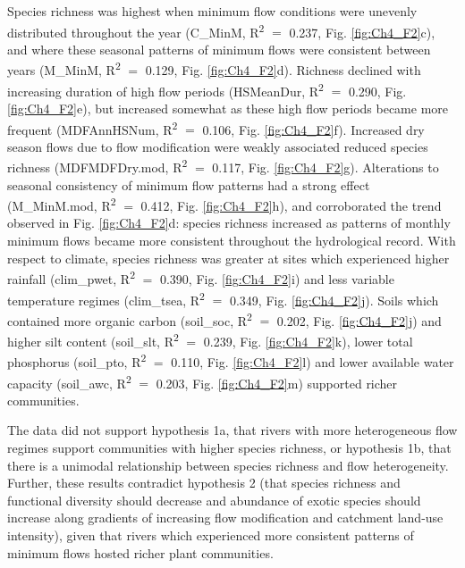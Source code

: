 \documentclass[openright,12pt,a4paper]{memoir}
\begin{document}
Species richness was highest when minimum flow conditions were unevenly distributed throughout the year (C\_MinM, R\textsuperscript{2}  $=$ 0.237, Fig. \ref{fig:Ch4_F2}c), and where these seasonal patterns of minimum flows were consistent between years (M\_MinM, R\textsuperscript{2}  $=$ 0.129, Fig. \ref{fig:Ch4_F2}d). Richness declined with increasing duration of high flow periods (HSMeanDur, R\textsuperscript{2}  $=$ 0.290, Fig. \ref{fig:Ch4_F2}e), but increased somewhat as these high flow periods became more frequent (MDFAnnHSNum, R\textsuperscript{2}  $=$ 0.106, Fig. \ref{fig:Ch4_F2}f). Increased dry season flows due to flow modification were weakly associated reduced species richness (MDFMDFDry.mod, R\textsuperscript{2}  $=$ 0.117, Fig. \ref{fig:Ch4_F2}g). Alterations to seasonal consistency of minimum flow patterns had a strong effect (M\_MinM.mod, R\textsuperscript{2}  $=$ 0.412, Fig. \ref{fig:Ch4_F2}h), and corroborated the trend observed in Fig. \ref{fig:Ch4_F2}d: species richness increased as patterns of monthly minimum flows became more consistent throughout the hydrological record. With respect to climate, species richness was greater at sites which experienced higher rainfall (clim\_pwet, R\textsuperscript{2}  $=$ 0.390, Fig. \ref{fig:Ch4_F2}i) and less variable temperature regimes (clim\_tsea, R\textsuperscript{2}  $=$ 0.349, Fig. \ref{fig:Ch4_F2}j). Soils which contained more organic carbon (soil\_soc, R\textsuperscript{2}  $=$ 0.202, Fig. \ref{fig:Ch4_F2}j) and higher silt content (soil\_slt, R\textsuperscript{2}  $=$ 0.239, Fig. \ref{fig:Ch4_F2}k), lower total phosphorus (soil\_pto, R\textsuperscript{2}  $=$ 0.110, Fig. \ref{fig:Ch4_F2}l) and lower available water capacity (soil\_awc, R\textsuperscript{2}  $=$ 0.203, Fig. \ref{fig:Ch4_F2}m) supported richer communities. 

The data did not support hypothesis 1a, that rivers with more heterogeneous flow regimes support communities with higher species richness, or hypothesis 1b, that there is a unimodal relationship between species richness and flow heterogeneity. Further, these results contradict hypothesis 2 (that species richness and functional diversity should decrease and abundance of exotic species should increase along gradients of increasing flow modification and catchment land-use intensity), given that rivers which experienced more consistent patterns of minimum flows hosted richer plant communities.
\end{document}
